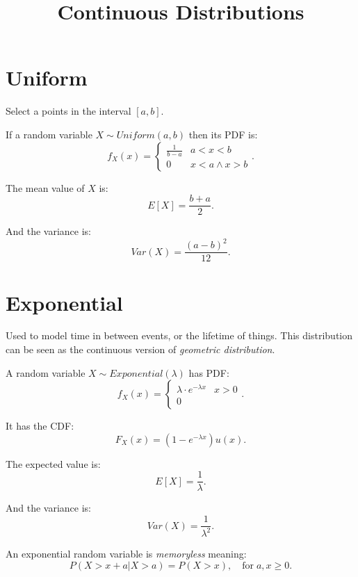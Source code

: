 \title{Continuous Distributions}

\section{Uniform}

Select a points in the interval $[a, b]$.

\begin{definition}
    If a random variable $X \sim Uniform(a, b)$ then its PDF is: \[
        f_X(x) = \left\{
            \begin{array}{ll}
                \frac{1}{b - a} & a < x < b \\
                0 & x < a \wedge x > b
            \end{array}
        \right.
    .\] 
\end{definition}

The mean value of $X$ is: \[
    E[X] = \frac{b+a}{2}
.\] 

And the variance is: \[
    Var(X) = \frac{(a-b)^{2}}{12}
.\]

\section{Exponential}

Used to model time in between events, or the lifetime of things.
This distribution can be seen as the continuous version of \emph{geometric distribution}.

\begin{definition}
    A random variable $X \sim Exponential(\lambda)$ has PDF: \[
        f_X(x) = \left\{
            \begin{array}{ll}
                \lambda \cdot e^{-\lambda x} & x > 0 \\
                0
            \end{array}
        \right.
    .\] 
\end{definition}

It has the CDF: \[
    F_X(x) = \left(1 - e^{-\lambda x}\right) u(x)
.\] 

The expected value is: \[
    E[X] = \frac{1}{\lambda}
.\] 

And the variance is: \[
    Var(X) = \frac{1}{\lambda^{2}}
.\] 

\begin{theorem}
    An exponential random variable is \emph{memoryless} meaning: \[
        P(X > x + a | X > a) = P(X > x), \quad \mathrm{for} \; a, x \geq 0
    .\] 
\end{theorem}

